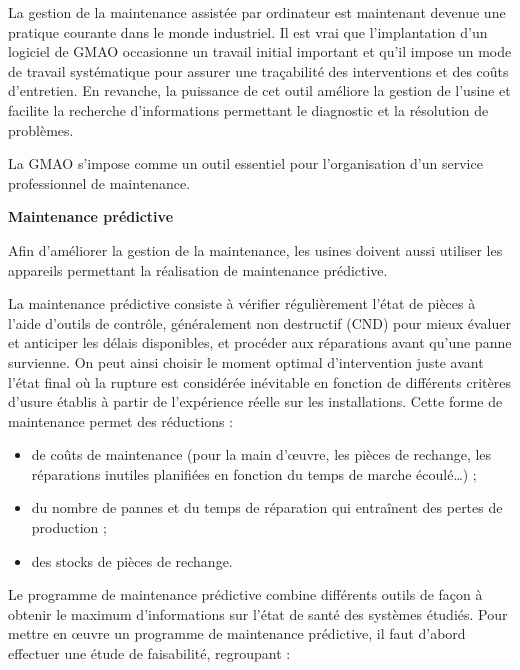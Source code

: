La gestion de la maintenance assistée par ordinateur est maintenant devenue une pratique courante dans le monde industriel. Il est vrai que l’implantation d’un logiciel de GMAO occasionne un travail initial important et qu’il impose un mode de travail systématique pour assurer une traçabilité des interventions et des coûts d’entretien. En revanche, la puissance de cet outil améliore la gestion de l’usine et facilite la recherche d’informations permettant le diagnostic et la résolution de problèmes.
\vspace{0.3cm} 

La GMAO s’impose comme un outil essentiel pour l’organisation d’un service professionnel de maintenance.

\vspace{0.3cm} 
\textbf{	Maintenance prédictive}
\vspace{0.3cm} 

Afin d’améliorer la gestion de la maintenance, les usines doivent aussi utiliser les appareils permettant la réalisation de maintenance prédictive.
\vspace{0.3cm} 

La maintenance prédictive consiste à vérifier régulièrement l’état de pièces à l’aide d’outils de contrôle, généralement non destructif (CND) pour mieux évaluer et anticiper les délais disponibles, et procéder aux réparations avant qu’une panne survienne. On peut ainsi choisir le moment optimal d’intervention juste avant l’état final où la rupture est considérée inévitable en fonction de différents critères d’usure établis à partir de l’expérience réelle sur les installations. Cette forme de maintenance permet des réductions :

\begin{itemize}
\item de coûts de maintenance (pour la main d’œuvre, les pièces de rechange, les réparations inutiles planifiées en fonction du temps de marche écoulé…) ;
\item du nombre de pannes et du temps de réparation qui entraînent des pertes de production ;
\item des stocks de pièces de rechange.
\end{itemize}

Le programme de maintenance prédictive combine différents outils de façon à obtenir le maximum d’informations sur l’état de santé des systèmes étudiés. Pour mettre en œuvre un programme de maintenance prédictive, il faut d’abord effectuer une étude de faisabilité, regroupant :

